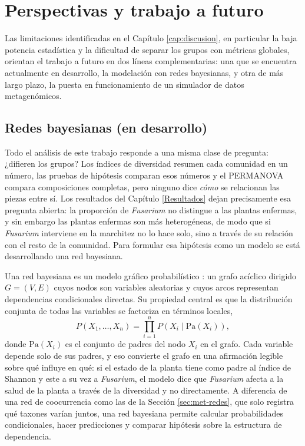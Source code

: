 \chapter{Perspectivas y trabajo a futuro}
\label{cap:perspectivas}

Las limitaciones identificadas en el Capítulo \ref{cap:discusion}, en particular la baja potencia estadística y la dificultad de
separar los grupos con métricas globales, orientan el trabajo a futuro en dos líneas
complementarias: una que se encuentra actualmente en desarrollo, la modelación con redes
bayesianas, y otra de más largo plazo, la puesta en funcionamiento de un simulador de datos
metagenómicos.

\section{Redes bayesianas (en desarrollo)}
\label{sec:bayesianas}

Todo el análisis de este trabajo responde a una misma clase de pregunta: ¿difieren los grupos? Los
índices de diversidad resumen cada comunidad en un número, las pruebas de hipótesis comparan esos
números y el PERMANOVA compara composiciones completas, pero ninguno dice \emph{cómo} se relacionan
las piezas entre sí. Los resultados del Capítulo \ref{Resultados} dejan precisamente esa pregunta
abierta: la proporción de \textit{Fusarium} no distingue a las plantas enfermas, y sin embargo las
plantas enfermas son más heterogéneas, de modo que si \textit{Fusarium} interviene en la marchitez
no lo hace solo, sino a través de su relación con el resto de la comunidad. Para formular esa
hipótesis como un modelo se está desarrollando una red bayesiana.

Una red bayesiana es un modelo gráfico probabilístico \citep{pearl1988probabilistic,
koller2009probabilistic}: un grafo acíclico dirigido $G = (V, E)$ cuyos nodos son variables
aleatorias y cuyos arcos representan dependencias condicionales directas. Su propiedad central es
que la distribución conjunta de todas las variables se factoriza en términos locales,
\begin{equation}
P(X_1, \dots, X_n) = \prod_{i=1}^{n} P\left(X_i \mid \mathrm{Pa}(X_i)\right),
\label{eq:factorizacion-bn}
\end{equation}
donde $\mathrm{Pa}(X_i)$ es el conjunto de padres del nodo $X_i$ en el grafo. Cada variable
depende solo de sus padres, y eso convierte el grafo en una afirmación legible sobre qué influye en
qué: si el estado de la planta tiene como padre al índice de Shannon y este a su vez a
\textit{Fusarium}, el modelo dice que \textit{Fusarium} afecta a la salud de la planta a través de
la diversidad y no directamente. A diferencia de una red de coocurrencia como las de la
Sección \ref{sec:met-redes}, que solo registra qué taxones varían juntos, una red bayesiana permite
calcular probabilidades condicionales, hacer predicciones y comparar hipótesis sobre la estructura
de dependencia.

